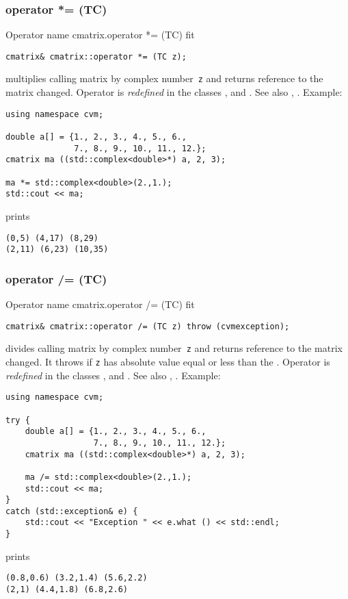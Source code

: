 \subsubsection{operator *= (TC)}
Operator%
\pdfdest name {cmatrix.operator *= (TC)} fit
\begin{verbatim}
cmatrix& cmatrix::operator *= (TC z);
\end{verbatim}
multiplies  calling matrix by  complex number~\verb"z"
and returns  reference to
the matrix changed.
Operator is \emph{redefined} in the classes
,  
and .
See also ,
.
Example:
\begin{Verbatim}
using namespace cvm;

double a[] = {1., 2., 3., 4., 5., 6.,
              7., 8., 9., 10., 11., 12.};
cmatrix ma ((std::complex<double>*) a, 2, 3);

ma *= std::complex<double>(2.,1.);
std::cout << ma;
\end{Verbatim}
prints
\begin{Verbatim}
(0,5) (4,17) (8,29)
(2,11) (6,23) (10,35)
\end{Verbatim}
\newpage



\subsubsection{operator /= (TC)}
Operator%
\pdfdest name {cmatrix.operator /= (TC)} fit
\begin{verbatim}
cmatrix& cmatrix::operator /= (TC z) throw (cvmexception);
\end{verbatim}
divides  calling matrix by  complex number~\verb"z"
and returns  reference to
the matrix changed.
It throws  
if \verb"z" has  absolute value equal or less
than the 
.
Operator is \emph{redefined} in the classes
,  
and .
See also ,
.
Example:
\begin{Verbatim}
using namespace cvm;

try {
    double a[] = {1., 2., 3., 4., 5., 6.,
                  7., 8., 9., 10., 11., 12.};
    cmatrix ma ((std::complex<double>*) a, 2, 3);

    ma /= std::complex<double>(2.,1.);
    std::cout << ma;
}
catch (std::exception& e) {
    std::cout << "Exception " << e.what () << std::endl;
}
\end{Verbatim}
prints
\begin{Verbatim}
(0.8,0.6) (3.2,1.4) (5.6,2.2)
(2,1) (4.4,1.8) (6.8,2.6)
\end{Verbatim}
\newpage




